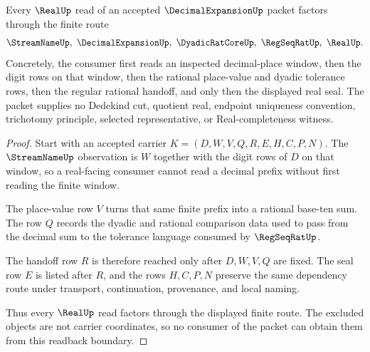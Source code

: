 \begin{theorem}\label{thm:decimal-expansion-real-readback-boundary}
Every $\RealUp$ read of an accepted $\DecimalExpansionUp$ packet factors
through the finite route
$$
\StreamNameUp,\ \DecimalExpansionUp,\ \DyadicRatCoreUp,\ \RegSeqRatUp,\ \RealUp .
$$
Concretely, the consumer first reads an inspected decimal-place window, then
the digit rows on that window, then the rational place-value and dyadic
tolerance rows, then the regular rational handoff, and only then the displayed
real seal. The packet supplies no Dedekind cut, quotient real, endpoint
uniqueness convention, trichotomy principle, selected representative, or
Real-completeness witness.
\end{theorem}
\begin{proof}
Start with an accepted carrier $K=(D,W,V,Q,R,E,H,C,P,N)$. The
$\StreamNameUp$ observation is $W$ together with the digit rows of $D$ on that
window, so a real-facing consumer cannot read a decimal prefix without first
reading the finite window.

The place-value row $V$ turns that same finite prefix into a rational
base-ten sum. The row $Q$ records the dyadic and rational comparison data used
to pass from the decimal sum to the tolerance language consumed by
$\RegSeqRatUp$.

The handoff row $R$ is therefore reached only after $D,W,V,Q$ are fixed. The
seal row $E$ is listed after $R$, and the rows $H,C,P,N$ preserve the same
dependency route under transport, continuation, provenance, and local naming.

Thus every $\RealUp$ read factors through the displayed finite route. The
excluded objects are not carrier coordinates, so no consumer of the packet can
obtain them from this readback boundary.
\end{proof}

